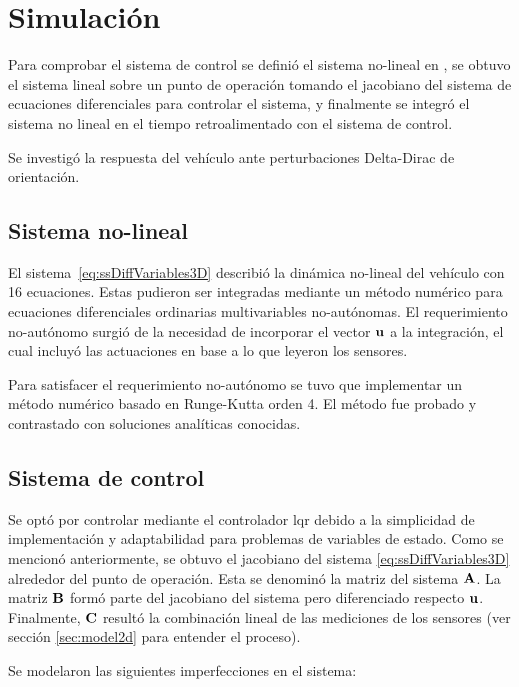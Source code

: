 \section{Simulación}\label{sec:simulation}

Para comprobar el sistema de control se definió el sistema no-lineal en \Matlab, se obtuvo el sistema lineal sobre un punto de operación tomando el jacobiano del sistema de ecuaciones diferenciales para controlar el sistema, y finalmente se integró el sistema no lineal en el tiempo retroalimentado con el sistema de control.

Se investigó la respuesta del vehículo ante perturbaciones Delta-Dirac de orientación.

\subsection{Sistema no-lineal}

El sistema~\eqref{eq:ssDiffVariables3D} describió la dinámica no-lineal del vehículo con 16 ecuaciones. Estas pudieron ser integradas mediante un método numérico para ecuaciones diferenciales ordinarias multivariables no-autónomas. El requerimiento no-autónomo surgió de la necesidad de incorporar el vector $\mathbf{u}$ a la integración, el cual incluyó las actuaciones en base a lo que leyeron los sensores. 

\medskip

Para satisfacer el requerimiento no-autónomo se tuvo que implementar un método numérico basado en Runge-Kutta orden 4. El método fue probado y contrastado con soluciones analíticas conocidas.

\subsection{Sistema de control}

Se optó por controlar mediante el controlador \gls{lqr} debido a la simplicidad de implementación y adaptabilidad para problemas de variables de estado. Como se mencionó anteriormente, se obtuvo el jacobiano del sistema \eqref{eq:ssDiffVariables3D} alrededor del punto de operación. Esta se denominó la matriz del sistema $\mathbf{A}$. La matriz $\mathbf{B}$ formó parte del jacobiano del sistema pero diferenciado respecto $\mathbf{u}$. Finalmente, $\mathbf{C}$ resultó la combinación lineal de las mediciones de los sensores (ver sección \ref{sec:model2d} para entender el proceso). 

Se modelaron las siguientes imperfecciones en el sistema:

